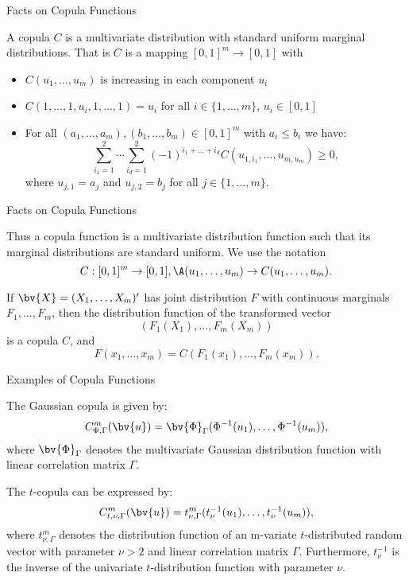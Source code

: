 {Facts on Copula Functions}


A copula $C$ is a multivariate distribution with standard uniform
marginal distributions. That is $C$ is a mapping $[0,1]^m
\rightarrow [0,1]$ with
\begin{itemize}
\item<1-> $C(u_1,\ldots,u_m)$ is increasing in each component $u_i$
\item<2-> $C(1,\ldots,1,u_i,1,\ldots,1)=u_i$ for all
$i\in\{1,\ldots,m\}$, $u_i\in[0,1]$
\item<3-> For all $(a_1,\ldots,a_m), (b_1,\ldots,b_m)\in[0,1]^m$ with
$a_i\leq b_i$ we have:
$$
\sum_{i_1=1}^2\cdots\sum_{i_d=1}^2(-1)^{i_1+\ldots+i_d}C(u_{1,i_1},\ldots,u_{m,u_m})
\geq 0,
$$
where $u_{j,1}=a_j$ and $u_{j,2}=b_j$ for all $j \in
\{1,\ldots,m\}$.
\end{itemize}




{Facts on Copula Functions}

Thus a copula function is a multivariate distribution function
such that its marginal distributions are standard uniform. We use
the notation
$$
C:[0,1]^m \rightarrow [0,1], \A (u_1, \ldots, u_m)\rightarrow
C(u_1, \ldots, u_m).
$$

If $\bv{X}=(X_1,\ldots,X_m)'$ has joint distribution $F$ with
continuous marginals $F_1,\ldots,F_m$, then the distribution
function of the transformed vector
$$
(F_1(X_1),\ldots,F_m(X_m))
$$
is a copula $C$, and
$$
F(x_1,\ldots,x_m)=C(F_1(x_1),\ldots,F_m(x_m)).
$$





{Examples of Copula Functions}


The Gaussian copula is given by:
$$
C^m_{\Phi,\Gamma}(\bv{u})=\bv{\Phi}_{\Gamma}(\Phi^{-1}(u_1),\ldots,\Phi^{-1}(u_m)),
$$
where $\bv{\Phi}_{\Gamma}$ denotes the multivariate Gaussian
distribution function with linear correlation matrix $\Gamma$.


The $t$-copula can be expressed by:
$$
C^m_{t,\nu,\Gamma}(\bv{u})=t^m_{\nu,\Gamma}(t_\nu^{-1}(u_1),\ldots,t_{\nu}^{-1}(u_m)),
$$
where $t^m_{\nu,\Gamma}$ denotes the distribution function of an
m-variate $t$-distributed random vector with parameter $\nu>2$ and
linear correlation matrix $\Gamma$. Furthermore, $t^{-1}_\nu$ is
the inverse of  the univariate $t$-distribution function with
parameter $\nu$.






